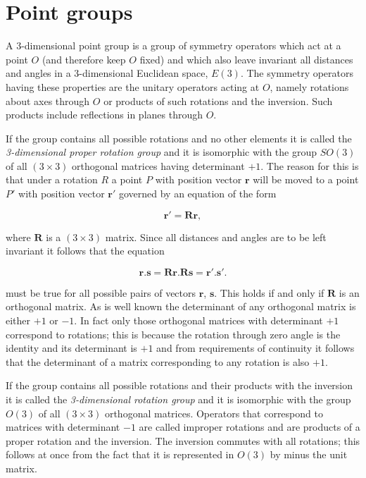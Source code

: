 \documentclass[11pt,a4paper,twoside,openright]{book}
\begin{document}
\section{Point groups}

A 3-dimensional point group is a group of symmetry operators which act at a point $O$ (and therefore keep $O$ fixed) and which also leave invariant all distances and angles in a 3-dimensional Euclidean space, $E(3)$. The symmetry operators having these properties are the unitary operators acting at $O$, namely rotations about axes through $O$ or products of such rotations and the inversion. Such products include reflections in planes through $O$.

If the group contains all possible rotations and no other elements it is called the \textit{3-dimensional proper rotation group} and it is isomorphic with the group $SO(3)$ of all $(3 \times 3)$ orthogonal matrices having determinant $+1$. The reason for this is that under a rotation $R$ a point $P$ with position vector $\mathbf{r}$ will be moved to a point $P'$ with position vector $\mathbf{r}'$ governed by an equation of the form

\begin{equation*}
\mathbf{r}' = \mathbf{R}\mathbf{r}, \tag{1.4.1}
\end{equation*}

where $\mathbf{R}$ is a $(3 \times 3)$ matrix. Since all distances and angles are to be left invariant it follows that the equation

\begin{equation*}
\mathbf{r}.\mathbf{s} = \mathbf{Rr}.\mathbf{Rs} = \mathbf{r}'.\mathbf{s}'. \tag{1.4.2}
\end{equation*}

must be true for all possible pairs of vectors $\mathbf{r}$, $\mathbf{s}$. This holds if and only if $\mathbf{R}$ is an orthogonal matrix. As is well known the determinant of any orthogonal matrix is either $+1$ or $-1$. In fact only those orthogonal matrices with determinant $+1$ correspond to rotations; this is because the rotation through zero angle is the identity and its determinant is $+1$ and from requirements of continuity it follows that the determinant of a matrix corresponding to any rotation is also $+1$.

If the group contains all possible rotations and their products with the inversion it is called the \textit{3-dimensional rotation group} and it is isomorphic with the group $O(3)$ of all $(3 \times 3)$ orthogonal matrices. Operators that correspond to matrices with determinant $-1$ are called improper rotations and are products of a proper rotation and the inversion. The inversion commutes with all rotations; this follows at once from the fact that it is represented in $O(3)$ by minus the unit matrix.
\end{document}
